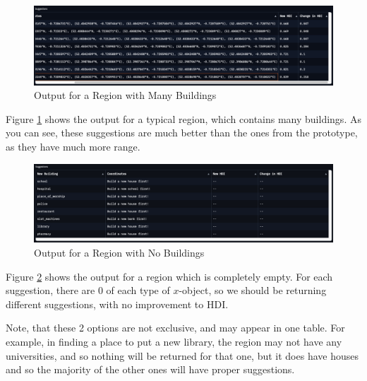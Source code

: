 \documentclass[12pt]{report}
\begin{document}
\begin{figure}[H]
\centering
\includegraphics[width=14cm]{ss21.3.png}
\caption{Output for a Region with Many Buildings}\label{fig:ss21.3}
\end{figure}

Figure \ref{fig:ss21.3} shows the output for a typical region, which contains many buildings. As you can see, these suggestions are much better than the ones from the  prototype, as they have much more range.

\begin{figure}[H]
\centering
\includegraphics[width=14cm]{ss21.4.png}
\caption{Output for a Region with No Buildings}\label{fig:ss21.4}
\end{figure}

Figure \ref{fig:ss21.4} shows the output for a region which is completely empty. For each suggestion, there are 0 of each type of $x$-object, so we should be returning different suggestions, with no improvement to HDI.

Note, that these 2 options are not exclusive, and may appear in one table. For example, in finding a place to put a new library, the region may not have any universities, and so nothing will be returned for that one, but it does have houses and so the majority of the other ones will have proper suggestions.

\begin{center}
\end{center}
\end{document}
